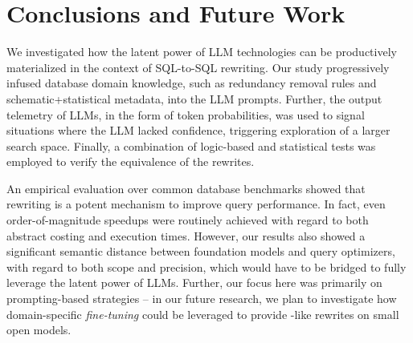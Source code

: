 \section{Conclusions and Future Work}
\label{sec:Conclusion}

We investigated how the latent power of LLM technologies can be productively materialized in the context of SQL-to-SQL rewriting.  Our study progressively infused database domain knowledge, such as redundancy removal rules and schematic+statistical metadata, into the LLM prompts. Further, the output telemetry of LLMs, in the form of token probabilities, was used to signal situations where the LLM lacked confidence, triggering exploration of a larger search space. Finally, a combination of logic-based and statistical tests was employed to verify the equivalence of the rewrites.


An empirical evaluation over common database benchmarks showed that rewriting is a potent mechanism to improve query performance. In fact, even order-of-magnitude speedups were routinely achieved with regard to both abstract costing and execution times.
However, our results also showed a significant semantic distance between foundation models and query optimizers, with regard to both scope and precision, which would have to be bridged to fully leverage the latent power of LLMs. Further, our focus here was primarily on prompting-based strategies -- in our future research, we plan to investigate how domain-specific \emph{fine-tuning} could be leveraged to provide \gpt-like rewrites on small open models.
